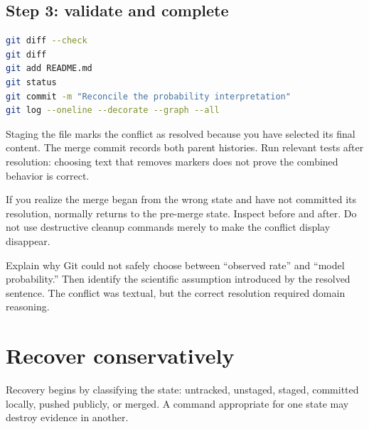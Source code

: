 \subsection*{Step 3: validate and complete}

\begin{lstlisting}[language=bash,numbers=none]
git diff --check
git diff
git add README.md
git status
git commit -m "Reconcile the probability interpretation"
git log --oneline --decorate --graph --all
\end{lstlisting}

Staging the file marks the conflict as resolved because you have selected its
final content. The merge commit records both parent histories. Run relevant
tests after resolution: choosing text that removes markers does not prove the
combined behavior is correct.

If you realize the merge began from the wrong state and have not committed its
resolution,  normally returns to the pre-merge state.
Inspect  before and after. Do not use destructive cleanup
commands merely to make the conflict display disappear.

\begin{checkpointbox}
Explain why Git could not safely choose between ``observed rate'' and ``model
probability.'' Then identify the scientific assumption introduced by the
resolved sentence. The conflict was textual, but the correct resolution required
domain reasoning.
\end{checkpointbox}

\section{Recover conservatively}

Recovery begins by classifying the state: untracked, unstaged, staged,
committed locally, pushed publicly, or merged. A command appropriate for one
state may destroy evidence in another.

